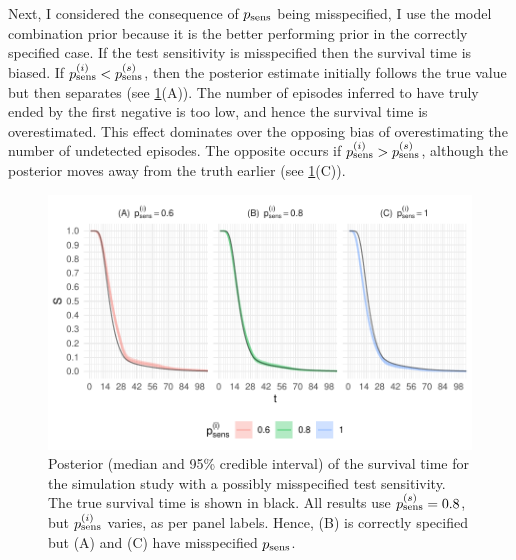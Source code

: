 \documentclass[thesis.tex]{subfiles}
\begin{document}
Next, I considered the consequence of $p_\text{sens}$ being misspecified, I use the model combination prior because it is the better performing prior in the correctly specified case.
If the test sensitivity is misspecified then the survival time is biased.
If $p_\text{sens}^{(i)} < p_\text{sens}^{(s)}$, then the posterior estimate initially follows the true value but then separates (see \cref{imperf-test:fig:misspecified-test-sensitivity}(A)).
The number of episodes inferred to have truly ended by the first negative is too low, and hence the survival time is overestimated.
This effect dominates over the opposing bias of overestimating the number of undetected episodes.
The opposite occurs if $p_\text{sens}^{(i)} > p_\text{sens}^{(s)}$, although the posterior moves away from the truth earlier (see \cref{imperf-test:fig:misspecified-test-sensitivity}(C)).
\begin{figure}
    \includegraphics[width=\textwidth]{cis-imperfect-testing/sim-misspecified-sensitivity}
  \caption[Simulation study results with misspecified test sensitivity]{%
    Posterior (median and 95\% credible interval) of the survival time for the simulation study with a possibly misspecified test sensitivity.
    The true survival time is shown in black.
    All results use $p_\text{sens}^{(s)} = 0.8$, but $p_\text{sens}^{(i)}$ varies, as per panel labels.
    Hence, (B) is correctly specified but (A) and (C) have misspecified $p_\text{sens}$.
  }
  \label{imperf-test:fig:misspecified-test-sensitivity}
\end{figure}
\end{document}
